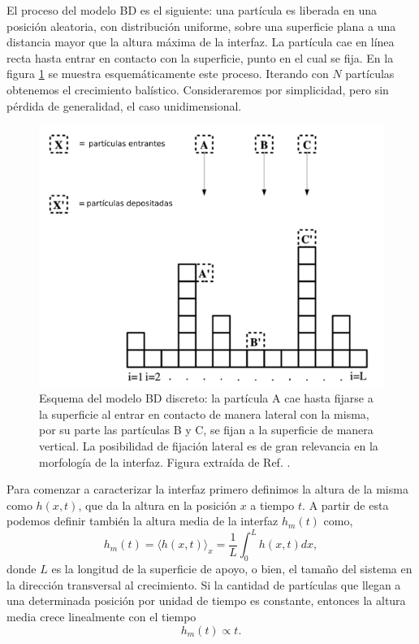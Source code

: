 El proceso del modelo BD es el siguiente: una partícula es liberada en una posición aleatoria, con distribución uniforme, sobre una superficie 
plana a una distancia mayor que la altura máxima de la interfaz. La partícula cae en línea recta hasta entrar en contacto con la superficie, punto en el 
cual se fija. En la figura \ref{fig:bd} se muestra esquemáticamente este proceso. Iterando con $N$ partículas obtenemos el crecimiento balístico. Consideraremos por simplicidad, pero sin pérdida de generalidad, el caso unidimensional.

\begin{figure}[!b]
    \centering
    \includegraphics[width=\imsize]{BD.png}
    \caption[Esquema del modelo BD discreto.]{Esquema del modelo BD discreto: la partícula A cae hasta fijarse a la superficie al entrar en contacto de manera lateral con la 
    misma, por su parte las partículas B y C, se fijan a la superficie de manera vertical. La posibilidad de fijación lateral es de gran relevancia en la morfología 
    de la interfaz. Figura extraída de Ref. \cite{farahzadi2008systematic}.}
    \label{fig:bd}
\end{figure}


Para comenzar a caracterizar la interfaz primero definimos la altura de la misma como $h(x,t)$, que da la altura en la posición $x$ a tiempo $t$. A partir de esta 
podemos definir también la altura media de la interfaz $h_m(t)$ como,
\begin{equation}
h_{m}(t) = \langle h(x,t) \rangle_x =  \frac{1}{L}\int_{0}^{L}h(x,t)dx,
\end{equation}
donde $L$ es la longitud de la superficie de apoyo, o bien, el tamaño del sistema en la dirección transversal al crecimiento. Si la cantidad de partículas que llegan a una determinada posición por unidad de tiempo es constante, entonces la altura media crece linealmente con el tiempo
\begin{equation}
    h_{m}(t) \propto t.
\end{equation}

